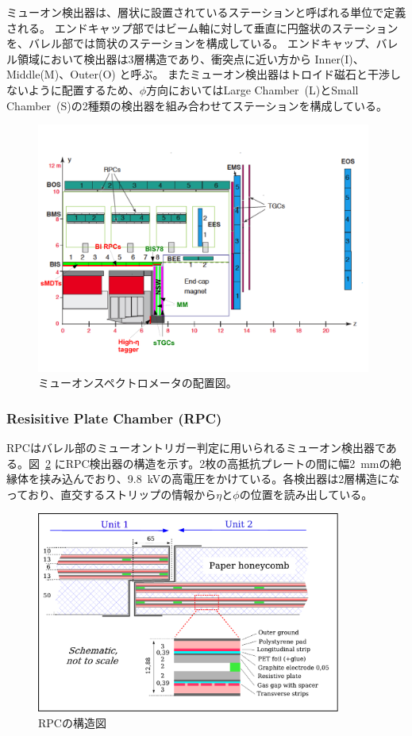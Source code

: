 ミューオン検出器は、層状に設置されているステーションと呼ばれる単位で定義される。
エンドキャップ部ではビーム軸に対して垂直に円盤状のステーションを、バレル部では筒状のステーションを構成している。
エンドキャップ、バレル領域において検出器は3層構造であり、衝突点に近い方から Inner(I)、Middle(M)、Outer(O) と呼ぶ。
またミューオン検出器はトロイド磁石と干渉しないように配置するため、$\phi$方向においてはLarge Chamber~(L)とSmall Chamber~(S)の2種類の検出器を組み合わせてステーションを構成している。

\begin{figure}[tb]
  \centering
  \includegraphics[clip, width=11cm]{fig/2/ch01_fig_03a.pdf}
  \caption{ミューオンスペクトロメータの配置図\cite{article:phase2}。}
  \label{fig:ミューオン}
\end{figure}

\subsubsection{Resisitive Plate Chamber (RPC)}
RPCはバレル部のミューオントリガー判定に用いられるミューオン検出器である。図~\ref{fig:RPC} にRPC検出器の構造を示す。2枚の高抵抗プレートの間に幅2~mmの絶縁体を挟み込んでおり、9.8~kVの高電圧をかけている。各検出器は2層構造になっており、直交するストリップの情報から$\eta$と$\phi$の位置を読み出している。

\begin{figure}[tb]
  \centering
  \includegraphics[clip, width=10cm]{fig/2/RPC_structure.pdf}
  \caption{RPCの構造図\cite{Aad:1129811}}
  \label{fig:RPC}
\end{figure}




